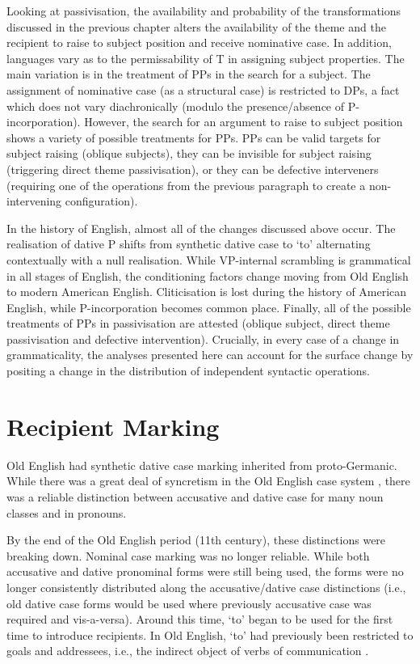 	Looking at passivisation, the availability and probability of the transformations discussed in the previous chapter alters the availability of the theme and the recipient to raise to subject position and receive nominative case. In addition, languages vary as to the permissability of T in assigning subject properties. The main variation is in the treatment of PPs in the search for a subject. The assignment of nominative case (as a structural case) is restricted to DPs, a fact which does not vary diachronically (modulo the presence/absence of P-incorporation). However, the search for an argument to raise to subject position shows a variety of possible treatments for PPs. PPs can be valid targets for subject raising (oblique subjects), they can be invisible for subject raising (triggering direct theme passivisation), or they can be defective interveners (requiring one of the operations from the previous paragraph to create a non-intervening configuration).

	In the history of English, almost all of the changes discussed above occur. The realisation of dative P shifts from synthetic dative case to `to' alternating contextually with a null realisation. While VP-internal scrambling is grammatical in all stages of English, the conditioning factors change moving from Old English to modern American English. Cliticisation is lost during the history of American English, while P-incorporation becomes common place. Finally, all of the possible treatments of PPs in passivisation are attested (oblique subject, direct theme passivisation and defective intervention). Crucially, in every case of a change in grammaticality, the analyses presented here can account for the surface change by positing a change in the distribution of independent syntactic operations.

\section{Recipient Marking}
	Old English had synthetic dative case marking inherited from proto-Germanic. While there was a great deal of syncretism in the Old English case system \citep{Allen.1999}, there was a reliable distinction between accusative and dative case for many noun classes and in pronouns.

	By the end of the Old English period (11th century), these distinctions were breaking down. Nominal case marking was no longer reliable. While both accusative and dative pronominal forms were still being used, the forms were no longer consistently distributed along the accusative/dative case distinctions (i.e., old dative case forms would be used where previously accusative case was required and vis-a-versa). Around this time, `to' began to be used for the first time to introduce recipients. In Old English, `to' had previously been restricted to goals and addressees, i.e., the indirect object of verbs of communication \citep{Allen.1999,McFadden.2002,OED.2013}. 

